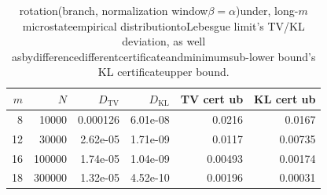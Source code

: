 \begin{table}[H]
\centering
\small
\begin{tabular}{rrrrrr}
\toprule
$m$ & $N$ & $D_{\mathrm{TV}}$ & $D_{\mathrm{KL}}$ & TV cert ub & KL cert ub\\
\midrule
8 & 10000 & 0.000126 & 6.01e-08 & 0.0216 & 0.0167\\
12 & 30000 & 2.62e-05 & 1.71e-09 & 0.0117 & 0.00735\\
16 & 100000 & 1.74e-05 & 1.04e-09 & 0.00493 & 0.00174\\
18 & 300000 & 1.32e-05 & 4.52e-10 & 0.00196 & 0.00031\\
\bottomrule
\end{tabular}
\caption{rotation(branch, normalization window$\beta=\alpha$)under, long-$m$ microstateempirical distributiontoLebesgue limit's  TV/KL deviation, as well asbydifferencedifferentcertificateandminimumsub-lower bound's  KL certificateupper bound.}
\label{tab:rotation-microstate-kl-certificate}
\end{table}
